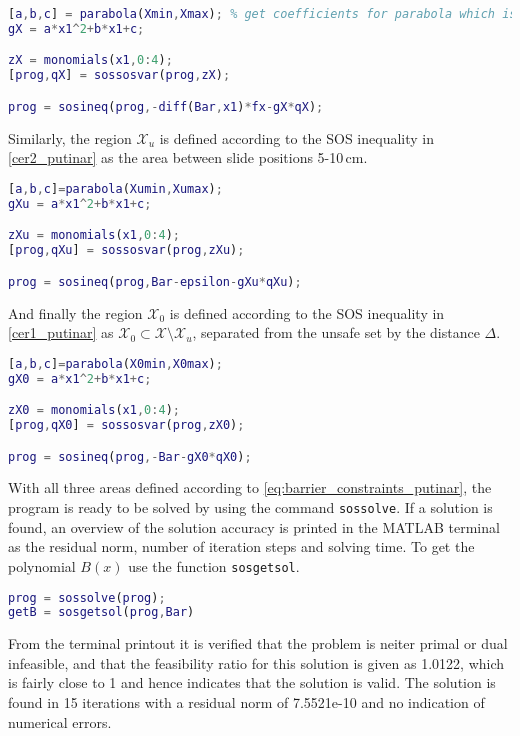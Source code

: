 \begin{lstlisting}[language=matlab]
% Define space X in Rn
[a,b,c] = parabola(Xmin,Xmax); % get coefficients for parabola which is positive for x in [-0.1,0.1] m
gX = a*x1^2+b*x1+c;

zX = monomials(x1,0:4);
[prog,qX] = sossosvar(prog,zX);

prog = sosineq(prog,-diff(Bar,x1)*fx-gX*qX);
\end{lstlisting}
Similarly, the region $\mathcal{X}_u$ is defined according to the SOS inequality in \autoref{cer2_putinar} as the area between slide positions 5-10\,cm.
\begin{lstlisting}[language=matlab]
% Define space Xu in X
[a,b,c]=parabola(Xumin,Xumax);
gXu = a*x1^2+b*x1+c;

zXu = monomials(x1,0:4);
[prog,qXu] = sossosvar(prog,zXu);

prog = sosineq(prog,Bar-epsilon-gXu*qXu);
\end{lstlisting}
And finally the region $\mathcal{X}_0$ is defined according to the SOS inequality in \autoref{cer1_putinar} as $\mathcal{X}_0\subset\mathcal{X}\setminus\mathcal{X}_u$, separated from the unsafe set by the distance $\Delta$.
\begin{lstlisting}[language=matlab]
% Define space X0 in X
[a,b,c]=parabola(X0min,X0max);
gX0 = a*x1^2+b*x1+c;

zX0 = monomials(x1,0:4);
[prog,qX0] = sossosvar(prog,zX0);

prog = sosineq(prog,-Bar-gX0*qX0);
\end{lstlisting}
With all three areas defined according to \autoref{eq:barrier_constraints_putinar}, the program is ready to be solved by using the command \texttt{sossolve}. If a solution is found, an overview of the solution accuracy is printed in the MATLAB terminal as the residual norm, number of iteration steps and solving time. To get the polynomial $B(x)$ use the function \texttt{sosgetsol}.
\begin{lstlisting}[language=matlab]
% Solve for barrier certificate
prog = sossolve(prog);
getB = sosgetsol(prog,Bar)
\end{lstlisting}

\vspace{-2mm}
From the terminal printout it is verified that the problem is neiter primal or dual infeasible, and that the feasibility ratio for this solution is given as 1.0122, which is fairly close to 1 and hence indicates that the solution is valid. The solution is found in 15 iterations with a residual norm of 7.5521e-10 and no indication of numerical errors.

